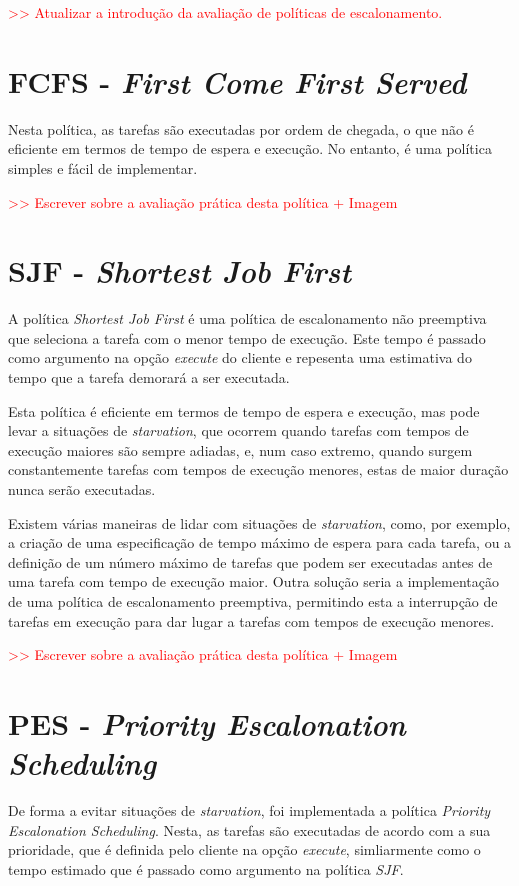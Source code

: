 \documentclass[a4paper,11pt]{scrreprt}
\begin{document}
    \textcolor{red}{>> Atualizar a introdução da avaliação de políticas de escalonamento.}
    \section{\textbf{FCFS} - \textit{First Come First Served}}
        Nesta política, as tarefas são executadas por ordem de chegada, o que não é
        eficiente em termos de tempo de espera e execução. No entanto, é uma política
        simples e fácil de implementar.

        \textcolor{red}{>> Escrever sobre a avaliação prática desta política + Imagem}
    \section{\textbf{SJF} - \textit{Shortest Job First}}
        A política \textit{Shortest Job First} é uma política de escalonamento não preemptiva
        que seleciona a tarefa com o menor tempo de execução. Este tempo é passado como
        argumento na opção \textit{execute} do cliente e repesenta uma estimativa do tempo
        que a tarefa demorará a ser executada.

        Esta política é eficiente em termos de tempo de espera e execução, mas pode levar
        a situações de \textit{starvation}, que ocorrem quando tarefas com tempos de execução
        maiores são sempre adiadas, e, num caso extremo, quando surgem constantemente tarefas
        com tempos de execução menores, estas de maior duração nunca serão executadas.

        Existem várias maneiras de lidar com situações de \textit{starvation}, como, por exemplo,
        a criação de uma especificação de tempo máximo de espera para cada tarefa, ou a
        definição de um número máximo de tarefas que podem ser executadas antes de uma
        tarefa com tempo de execução maior. Outra solução seria a implementação de uma
        política de escalonamento preemptiva, permitindo esta a interrupção de tarefas em
        execução para dar lugar a tarefas com tempos de execução menores.

        \textcolor{red}{>> Escrever sobre a avaliação prática desta política + Imagem}
    \section{\textbf{PES} - \textit{Priority Escalonation Scheduling}}
        De forma a evitar situações de \textit{starvation}, foi implementada a política
        \textit{Priority Escalonation Scheduling}. Nesta, as tarefas são executadas
        de acordo com a sua prioridade, que é definida pelo cliente na opção \textit{execute},
        simliarmente como o tempo estimado que é passado como argumento na política \textit{SJF}.
\end{document}
